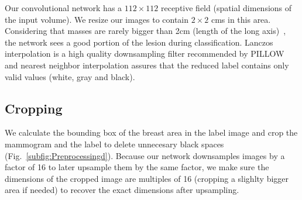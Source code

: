 Our convolutional network has a $112 \times 112$ receptive field (spatial dimensions of the input volume).
We resize our images to contain $2 \times 2$ cms in this area. Considering that masses are rarely bigger than 2cm (length of the long axis)~\cite{Sahiner1996}, the network sees a good portion of the lesion during classification.
Lanczos interpolation is a high quality downsampling filter recommended by PILLOW and nearest neighbor interpolation assures that the reduced label contains only valid values (white, gray and black).


\subsection{Cropping}
We calculate the bounding box of the breast area in the label image and crop the mammogram and the label to delete unnecesary black spaces (Fig.~\ref{subfig:Preprocessingd}). 
Because our network downsamples images by a factor of 16 to later upsample them by the same factor, we make sure the dimensions of the cropped image are multiples of 16 (cropping a slighlty bigger area if needed) to recover the exact dimensions after upsampling.


